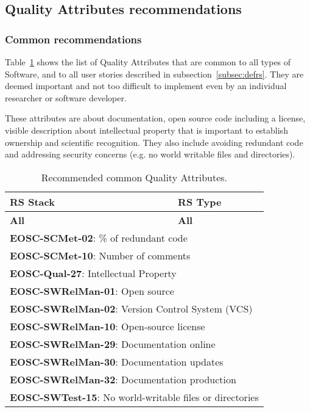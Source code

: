 \subsection{Quality Attributes recommendations}
\label{subsec:attributesrecomen}

\subsubsection{Common recommendations}

Table~\ref{tab:rs_recc00} shows the list of Quality Attributes that are common to all types of Software, and to all user stories described in subsection~\ref{subsec:defrs}. They are deemed important and not too difficult to implement even by an individual researcher or software developer.

These attributes are about documentation, open source code including a license, visible description about intellectual property that is important to establish ownership and scientific recognition. They also include avoiding redundant code and addressing security concerns (e.g. no world writable files and directories).

\begin{center}
\begin{table}[h]
  \small
  \begin{tabular}{|p{0.65\linewidth}|p{0.35\linewidth}|} \hline

    \textbf{RS Stack} & \textbf{RS Type} \\ \hline \hline
    \textbf{All} &
    \textbf{All} \\ \hline \hline
    \multicolumn{2}{|l|}{\textbf{EOSC-SCMet-02}: \% of redundant code} \\ \hline
    \multicolumn{2}{|l|}{\textbf{EOSC-SCMet-10}: Number of comments} \\ \hline
    \multicolumn{2}{|l|}{\textbf{EOSC-Qual-27}: Intellectual Property} \\ \hline
    \multicolumn{2}{|l|}{\textbf{EOSC-SWRelMan-01}: Open source} \\ \hline
    \multicolumn{2}{|l|}{\textbf{EOSC-SWRelMan-02}: Version Control System (VCS)} \\ \hline
    \multicolumn{2}{|l|}{\textbf{EOSC-SWRelMan-10}: Open-source license} \\ \hline
    \multicolumn{2}{|l|}{\textbf{EOSC-SWRelMan-29}: Documentation online} \\ \hline
    \multicolumn{2}{|l|}{\textbf{EOSC-SWRelMan-30}: Documentation updates} \\ \hline
    \multicolumn{2}{|l|}{\textbf{EOSC-SWRelMan-32}: Documentation production} \\ \hline
    \multicolumn{2}{|l|}{\textbf{EOSC-SWTest-15}: No world-writable files or directories} \\ \hline

  \end{tabular}
  \caption{Recommended common Quality Attributes.}
  \label{tab:rs_recc00}
\end{table}
\end{center}

